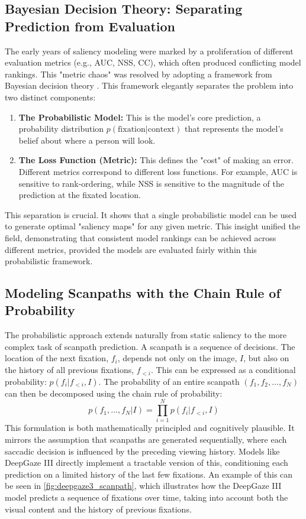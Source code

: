 \subsection{Bayesian Decision Theory: Separating Prediction from Evaluation}
The early years of saliency modeling were marked by a proliferation of different evaluation metrics (e.g., AUC, NSS, CC), which often produced conflicting model rankings. This "metric chaos" was resolved by adopting a framework from Bayesian decision theory \cite{kummerer2023predicting}. This framework elegantly separates the problem into two distinct components:
\begin{enumerate}
\item \textbf{The Probabilistic Model:} This is the model's core prediction, a probability distribution $p(\text{fixation} | \text{context})$ that represents the model's belief about where a person will look.
\item \textbf{The Loss Function (Metric):} This defines the "cost" of making an error. Different metrics correspond to different loss functions. For example, AUC is sensitive to rank-ordering, while NSS is sensitive to the magnitude of the prediction at the fixated location.
\end{enumerate}
This separation is crucial. It shows that a single probabilistic model can be used to generate optimal "saliency maps" for any given metric. This insight unified the field, demonstrating that consistent model rankings can be achieved across different metrics, provided the models are evaluated fairly within this probabilistic framework.
\subsection{Modeling Scanpaths with the Chain Rule of Probability}
The probabilistic approach extends naturally from static saliency to the more complex task of scanpath prediction. A scanpath is a sequence of decisions. The location of the next fixation, $f_i$, depends not only on the image, $I$, but also on the history of all previous fixations, $f_{<i}$. This can be expressed as a conditional probability: $p(f_i | f_{<i}, I)$. The probability of an entire scanpath $(f_1, f_2, ..., f_N)$ can then be decomposed using the chain rule of probability:
\begin{equation}
p(f_1, ..., f_N | I) = \prod_{i=1}^{N} p(f_i | f_{<i}, I)
\end{equation}
This formulation is both mathematically principled and cognitively plausible.
It mirrors the assumption that scanpaths are generated sequentially, where each saccadic decision is influenced by the preceding viewing history. Models like DeepGaze III directly implement a tractable version of this, conditioning each prediction on a limited history of the last few fixations.
An example of this can be seen in \cref{fig:deepgaze3_scanpath}, which illustrates how the DeepGaze III model predicts a sequence of fixations over time, taking into account both the visual content and the history of previous fixations.

